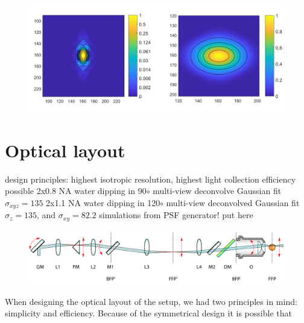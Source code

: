   \begin{figure}
    \centering
    \includegraphics[width=1\textwidth]{psfs/SPIMx120.pdf}
    \label{fig:psf-spimx120}
  \end{figure}
      


\section{Optical layout}
  design principles:
  highest isotropic resolution, highest light collection efficiency possible
  2x0.8 NA water dipping in 90$\circ$ multi-view deconvolve Gaussian fit $\sigma_{xyz}=135$
  2x1.1 NA water dipping in 120$\circ$ multi-view deconvolved Gaussian fit $\sigma_z = 135$, and $\sigma_{xy} = 82.2$
  simulations from PSF generator! put here

  \begin{figure}[bth]
    \centering
    \includegraphics[page=1,width=1\textwidth]{schematicsLinear}
    \label{fig:schematicsLinear}
  \end{figure}

  When designing the optical layout of the setup, we had two principles in mind: simplicity and efficiency. Because of the symmetrical design it is possible that

